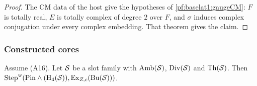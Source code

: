 \begin{proof}
The CM data of the host give the hypotheses of \cref{pf:baselat1:gaugeCM}: $F$ is totally real, $E$ is totally
complex of degree $2$ over $F$, and $\sigma$ induces complex conjugation under every complex embedding. That theorem
gives the claim.
\end{proof}

\subsubsection{Constructed cores}

\begin{theorem}\label{pf:baselat1:core}
Assume (A16). Let $\mathcal S$ be a slot family with $\mathrm{Amb}(\mathcal S)$,
$\mathrm{Div}(\mathcal S)$ and $\mathrm{Th}(\mathcal S)$. Then
$\mathrm{Step}^{\mathrm w}(\mathrm{Pin}\wedge(\mathrm{H}_4(\mathcal S)),\mathrm{Ex}_{Z,c}(\mathrm{Bu}(\mathcal S)))$.
\end{theorem}

